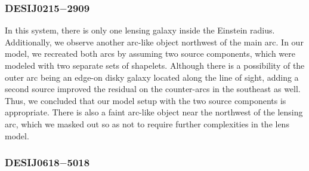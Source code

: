 \documentclass{aa}
\begin{document}

\subsubsection{DESIJ0215$-$2909}

In this system, there is only one lensing galaxy inside the Einstein radius. Additionally, we observe another arc-like object northwest of the main arc. In our model, we recreated both arcs by assuming two source components, which were modeled with two separate sets of shapelets. Although there is a possibility of the outer arc being an edge-on disky galaxy located along the line of sight, adding a second source improved the residual on the counter-arcs in the southeast as well. Thus, we concluded that our model setup with the two source components is appropriate. There is also a faint arc-like object near the northwest of the lensing arc, which we masked out so as not to require further complexities in the lens model.




\subsubsection{DESIJ0618$-$5018}
\end{document}
